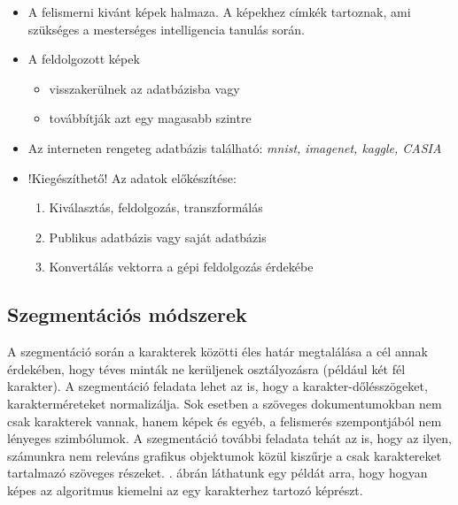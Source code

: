 \begin{itemize}
\item A felismerni kivánt képek halmaza. A képekhez címkék tartoznak, ami szükséges a mesterséges intelligencia tanulás során.
\item A feldolgozott képek
	\begin{itemize}
	\item visszakerülnek az adatbázisba vagy
	\item továbbítják azt egy magasabb szintre
	\end{itemize}	  
\item Az interneten rengeteg adatbázis található: \textit{mnist, imagenet, kaggle, CASIA}
\item !Kiegészíthető! Az adatok előkészítése:
	\begin{enumerate}
	\item Kiválasztás, feldolgozás, transzformálás
	\item Publikus adatbázis vagy saját adatbázis
	\item Konvertálás vektorra a gépi feldolgozás érdekébe
	\end{enumerate}
\end{itemize}

\cite{feldolgozasi_szintek}

\subsection{Szegmentációs módszerek}

A szegmentáció során a karakterek közötti éles határ megtalálása a cél annak érdekében, hogy téves minták ne kerüljenek osztályozásra (például két fél karakter). A szegmentáció feladata lehet az is, hogy a karakter-dőlésszögeket, karakterméreteket normalizálja. Sok esetben a szöveges dokumentumokban nem csak karakterek vannak, hanem képek és egyéb, a felismerés szempontjából nem lényeges szimbólumok. A szegmentáció további feladata tehát az is, hogy az ilyen, számunkra nem releváns grafikus objektumok közül kiszűrje a csak karaktereket tartalmazó szöveges részeket. . ábrán láthatunk egy példát arra, hogy hogyan képes az algoritmus kiemelni az egy karakterhez tartozó képrészt.

